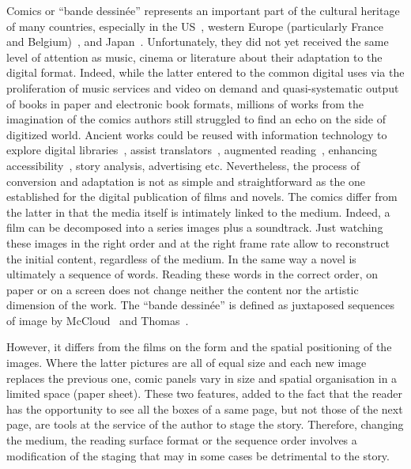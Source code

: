 Comics or ``bande dessin{\'e}e'' represents an important part of the cultural heritage of many countries, especially in the US~\cite{Stewart2000,IBISWorld2013}, western Europe (particularly France and Belgium)~\cite{Ratier2013}, and Japan~\cite{Japan2013}.
Unfortunately, they did not yet received the same level of attention as music, cinema or literature about their adaptation to the digital format.
Indeed, while the latter entered to the common digital uses via the proliferation of music services and video on demand and quasi-systematic output of books in paper and electronic book formats, millions of works from the imagination of the comics authors still struggled to find an echo on the side of digitized world.
Ancient works could be reused with information technology to explore digital libraries~\cite{Back2001}, assist translators~\cite{borodo2014multimodality}, augmented reading~\cite{Singh2004,Raulet2013Comics}, enhancing accessibility~\cite{Brandon2014,Ponsard09}, story analysis, advertising etc.
Nevertheless, the process of conversion and adaptation is not as simple and straightforward as the one established for the digital publication of films and novels.
The comics differ from the latter in that the media itself is intimately linked to the medium.
Indeed, a film can be decomposed into a series images plus a soundtrack. Just watching these images in the right order and at the right frame rate allow to reconstruct the initial content, regardless of the medium. 
In the same way a novel is ultimately a sequence of words.
Reading these words in the correct order, on paper or on a screen does not change neither the content nor the artistic dimension of the work.
The ``bande dessinée'' is defined as juxtaposed sequences of image by McCloud~\cite{McCloud94} and Thomas~\cite{Thomas2010Invisible}.

However, it differs from the films on the form and the spatial positioning of the images.
Where the latter pictures are all of equal size and each new image replaces the previous one, comic panels vary in size and spatial organisation in a limited space (paper sheet).
These two features, added to the fact that the reader has the opportunity to see all the boxes of a
same page, but not those of the next page, are tools at the service of the author to stage the story.
Therefore, changing the medium, the reading surface format or the sequence order involves a modification of the staging that may in some cases be detrimental to the story.

